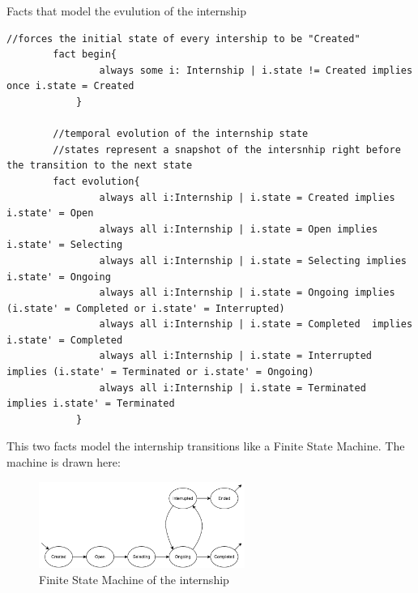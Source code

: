 \par Facts that model the evulution of the internship

\begin{lstlisting}[language=Alloy]
        //forces the initial state of every intership to be "Created"
        fact begin{
                always some i: Internship | i.state != Created implies once i.state = Created
            }
        
        //temporal evolution of the internship state
        //states represent a snapshot of the intersnhip right before the transition to the next state
        fact evolution{
                always all i:Internship | i.state = Created implies  i.state' = Open
                always all i:Internship | i.state = Open implies  i.state' = Selecting
                always all i:Internship | i.state = Selecting implies  i.state' = Ongoing
                always all i:Internship | i.state = Ongoing implies (i.state' = Completed or i.state' = Interrupted)
                always all i:Internship | i.state = Completed  implies i.state' = Completed
                always all i:Internship | i.state = Interrupted  implies (i.state' = Terminated or i.state' = Ongoing)
                always all i:Internship | i.state = Terminated  implies i.state' = Terminated
            }
\end{lstlisting}

\par This two facts model the internship transitions like a Finite State Machine. The machine is drawn here:

\begin{figure}[H]
    \centering
    \includegraphics[width=0.6\textwidth]{Images/Alloy_images/FSM.pdf}
    \caption{Finite State Machine of the internship}
\end{figure}



